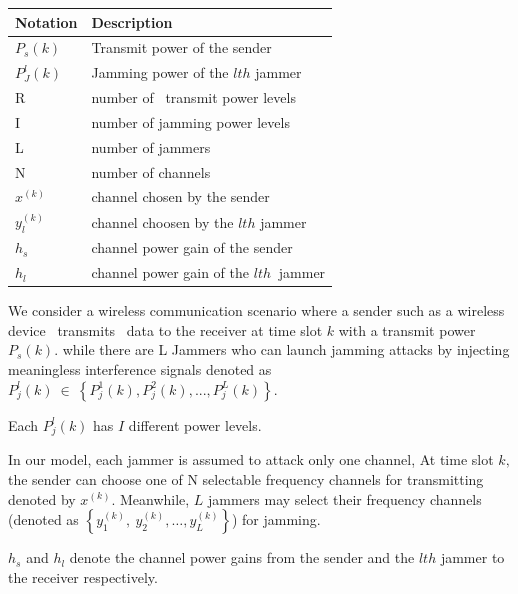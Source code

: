 \documentclass[letterpaper%
, twoside%
, 12pt%
,thesepararticles%
, english%
,creativecommons,hyperref, withAlgo2e%
]{thETS}
\begin{document}
\begin{table}[!h]
        \centering        
\begin{tabular}{|p{}|p{}|}
\hline 
 Notation & Description \\
\hline 
 $\displaystyle P_{s}( k)$ & Transmit power of the sender  \\
\hline 
 $\displaystyle P^{l}_{J}( k)$ & Jamming power of the $\displaystyle lth$ jammer \\
\hline 
 R & number of \ transmit power levels \\
\hline 
 I & number of jamming power levels \\
\hline 
 L & number of jammers \\
\hline 
 N  & number of channels \\
\hline 
 $\displaystyle x^{( k)}$ & channel chosen by the sender \\
\hline 
 $\displaystyle y^{( k)}_{l}$ & channel choosen by the $\displaystyle lth$ jammer \\
\hline 
 $\displaystyle h_{s}$ & channel power gain of the sender \\
\hline 
 $\displaystyle h_{l}$ & channel power gain of the $\displaystyle lth\ $ jammer \\
 \hline
\end{tabular}        
\end{table}

We consider a wireless communication scenario where a sender such as a wireless device \ transmits \ data to the receiver at time slot $\displaystyle k$ with a transmit power $\displaystyle P_{s}( k)$. while there are L Jammers who can launch jamming attacks by injecting meaningless interference signals denoted as $\displaystyle P^{l}_{j}( k) \ \in \ \left\{P^{1}_{j}( k) ,P^{2}_{j}( k) ,...,P^{L}_{j}( k)\right\} .$

Each $\displaystyle P^{l}_{j}( k)$ has $\displaystyle I$ different power levels. 

In our model, each jammer is assumed to attack only one channel, At time slot $\displaystyle k,$the sender can choose one of N selectable frequency channels for transmitting denoted by $\displaystyle x^{( k)} .$ Meanwhile, $\displaystyle L$ jammers may select their frequency channels (denoted as $\displaystyle \left\{y^{( k)}_{1} ,\ y^{( k)}_{2} ,\dotsc ,y^{( k)}_{L}\right\}$) for jamming. 

$\displaystyle h_{s}$ and $\displaystyle h_{l}$ denote the channel power gains from the sender and the $\displaystyle lth$ jammer to the receiver respectively. 
\end{document}
